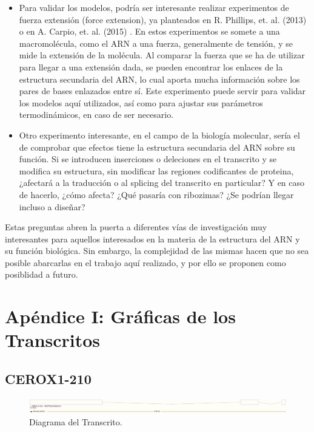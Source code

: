 \documentclass[a4paper,11pt,titlepage]{article}
\theoremstyle{definition}
\begin{document}
\begin{itemize}
    \item Para validar los modelos, podría ser interesante realizar experimentos de fuerza extensión (force extension), ya planteados en R. Phillips, et. al. (2013) \cite{phillips} o en A. Carpio, et. al. (2015) \cite{bonilla}. En estos experimentos se somete a una macromolécula, como el ARN a una fuerza, generalmente de tensión, y se mide la extensión de la molécula. Al comparar la fuerza que se ha de utilizar para llegar a una extensión dada, se pueden encontrar los enlaces de la estructura secundaria del ARN, lo cual aporta mucha información sobre los pares de bases enlazados entre sí. Este experimento puede servir para validar los modelos aquí utilizados, así como para ajustar sus parámetros termodinámicos, en caso de ser necesario.
    \item Otro experimento interesante, en el campo de la biología molecular, sería el de comprobar que efectos tiene la estructura secundaria del ARN sobre su función. Si se introducen inserciones o deleciones en el transcrito y se modifica su estructura, sin modificar las regiones codificantes de proteina, ¿afectará a la traducción o al splicing del transcrito en particular? Y en caso de hacerlo, ¿cómo afecta? ¿Qué pasaría con ribozimas? ¿Se podrían llegar incluso a diseñar?
\end{itemize}

Estas preguntas abren la puerta a diferentes vías de investigación muy interesantes para aquellos interesados en la materia de la estructura del ARN y su función biológica. Sin embargo, la complejidad de las mismas hacen que no sea posible abarcarlas en el trabajo aquí realizado, y por ello se proponen como posiblidad a futuro.


\newpage
\newpage
\printbibliography[title=Bibliografía, heading=bibnumbered]\label{sec:refs}

\newpage
\section{Apéndice I: Gráficas de los Transcritos}\label{sec:graphs}

\subsection*{CEROX1-210}\label{subsec:gene1}

\begin{figure}[H]
    \centering
    \includegraphics[width=\textwidth]{images/CEROX1-210.png}
    \caption{Diagrama del Transcrito.}
    \label{fig:CEROX1-210-diag}
\end{figure}
\end{document}
